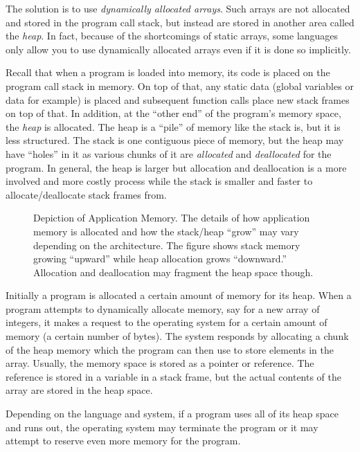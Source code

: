 The solution is to use \emph{dynamically allocated arrays}.  Such arrays
are not allocated and stored in the program call stack, but instead are
stored in another area called the \emph{heap}.  In fact, because of the 
shortcomings of static arrays, some languages only allow you to use 
dynamically allocated arrays even if it is done so implicitly.

Recall that when a program is loaded into memory, its code is placed
on the program call stack in memory.  On top of that, any static data 
(global variables or data for example) is placed and subsequent 
function calls place new stack frames on top of that.  In addition, 
at the ``other end'' of the program's memory space, the \emph{heap}
is allocated.  The heap is a ``pile'' of memory like the stack is, but it
is less structured.  The stack is one contiguous piece of memory, but
the heap may have ``holes'' in it as various chunks of it are \emph{allocated}
and \emph{deallocated} for the program.  In general, the heap is larger 
but allocation and deallocation is a more involved and more costly 
process while the stack is smaller and faster to allocate/deallocate 
stack frames from.

\begin{figure}
\centering

\caption[Depiction of Application Memory.]{Depiction of Application Memory.  The details of
how application memory is allocated and how the stack/heap ``grow'' may vary depending
on the architecture.  The figure shows stack memory growing ``upward'' while heap allocation
grows ``downward.''  Allocation and deallocation may fragment the heap space though.}
\label{figure:stackAndHeap}
\end{figure}

Initially a program is allocated a certain amount of memory for its heap.
When a program attempts to dynamically allocate memory, say for a
new array of integers, it makes a request to the operating system for
a certain amount of memory (a certain number of bytes).  The system
responds by allocating a chunk of the heap memory which the program
can then use to store elements in the array.  Usually, the memory space
is stored as a pointer or reference.  The reference is stored in a variable
in a stack frame, but the actual contents of the array are stored in the
heap space.

Depending on the language and system, if a program uses all of its 
heap space and runs out, the operating system may terminate the program or it 
may attempt to reserve even more memory for the program.

